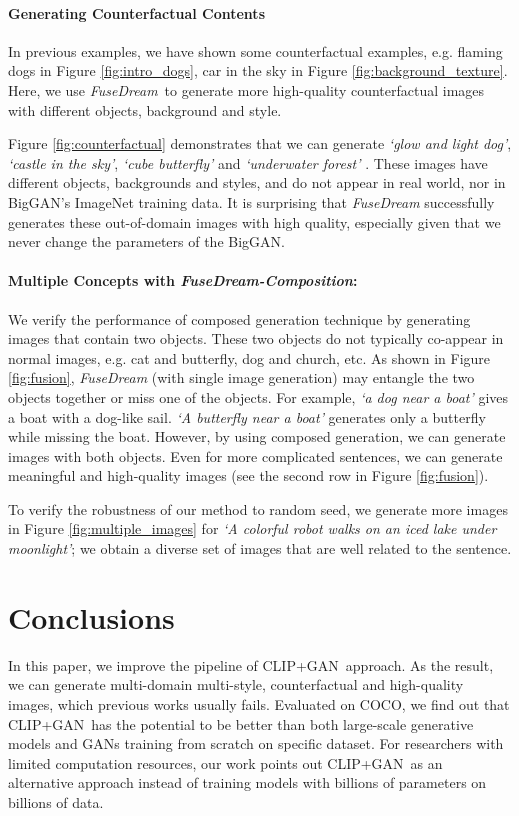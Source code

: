 \documentclass[10pt,twocolumn,letterpaper]{article}
\newcommand{\our}{\emph{FuseDream}}
\newcommand{\ganclip}{CLIP+GAN}
\newcommand{\ourcomp}{\our\emph{-Composition}}
\begin{document}
\paragraph{Generating Counterfactual Contents}
In previous examples, we have shown some counterfactual examples, e.g. flaming dogs in Figure \ref{fig:intro_dogs}, car in the sky in Figure \ref{fig:background_texture}. 
Here, we use \our~to generate more 
high-quality counterfactual images with  different objects, background and style.

Figure \ref{fig:counterfactual} demonstrates that we can generate \emph{`glow and light dog'}, 
\emph{`castle in the sky'}, \emph{`cube butterfly'} and \emph{`underwater forest'}
. These images have different objects, backgrounds and styles, and do not appear in real world, nor in BigGAN's ImageNet training data.
It is surprising that {\our} successfully generates these out-of-domain images with high quality, especially given that we 
never change the parameters of the BigGAN.

\paragraph{Multiple Concepts with \ourcomp:}
We verify the performance of composed generation technique 
by generating images that contain two objects.
These two objects do not typically co-appear in normal images, e.g. cat and butterfly, dog and church, etc.
As shown in Figure \ref{fig:fusion}, {\our} (with single image generation) may entangle the two objects together or miss one of the objects. 
For example, \emph{`a dog near a boat'} gives a boat with a dog-like sail. \emph{`A butterfly near a boat'} generates only a butterfly while missing the boat.
However, by using composed generation, we can generate images with both objects. 
Even for more complicated sentences, we can generate meaningful and high-quality images (see the second row in Figure \ref{fig:fusion}).

To verify the robustness of our method to random seed, we  generate more images 
in Figure \ref{fig:multiple_images} for \emph{`A colorful robot walks on an iced lake under moonlight'}; we obtain a diverse set of images that are well related to the sentence.  




 
\section{Conclusions}
\iffalse
In this paper, we improve the pipeline of \ganclip~approach. 
As the result, we can generate multi-domain multi-style, counterfactual and high-quality images, 
which previous works usually fails.
Evaluated on COCO, we find out that \ganclip~has the potential to be better than both large-scale generative models and GANs training from scratch on specific dataset.
For researchers with limited computation resources, 
our work points out \ganclip~as an alternative approach instead of training models with billions of parameters on billions of data.
\end{document}
